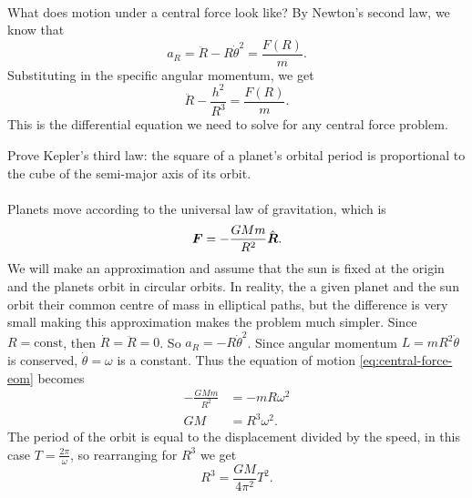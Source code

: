 \documentclass[../classical_mechanics.tex]{subfiles}
\begin{document}
        \paragraph{}
        What does motion under a central force look like?
        By Newton's second law, we know that
        \begin{equation}\label{eq:central-force-eom}
            a_R=\ddot{R}-R\dot{\theta}^2=\frac{F(R)}{m}.
        \end{equation}
        Substituting in the specific angular momentum, we get
        \begin{equation}
            \ddot{R}-\frac{h^2}{R^3}=\frac{F(R)}{m}.
        \end{equation}
        This is the differential equation we need to solve for any central force problem.
        \begin{example}
            Prove Kepler's third law: the square of a planet's orbital period is proportional to the cube of the semi-major axis of its orbit.

            \paragraph{}
            Planets move according to the universal law of gravitation, which is
            \begin{equation}
                \boldsymbol{F}=-\frac{GMm}{R^2}\hat{\boldsymbol{R}}.
            \end{equation}
            We will make an approximation and assume that the sun is fixed at the origin and the planets orbit in circular orbits.
            In reality, the a given planet and the sun orbit their common centre of mass in elliptical paths, but the difference is very small making this approximation makes the problem much simpler.
            Since $R=\text{const}$, then $\dot{R}=\ddot{R}=0$.
            So $a_R=-R\dot{\theta}^2$.
            Since angular momentum $L=mR^2\dot{\theta}$ is conserved, $\dot{\theta}=\omega$ is a constant.
            Thus the equation of motion \ref{eq:central-force-eom} becomes
            \begin{align}
                -\frac{GMm}{R^2}&=-mR\omega^2\\
                GM&=R^3\omega^2.
            \end{align}
            The period of the orbit is equal to the displacement divided by the speed, in this case $T=\frac{2\pi}{\omega}$, so rearranging for $R^3$ we get
            \begin{equation}
                R^3=\frac{GM}{4\pi^2}T^2.
            \end{equation}
        \end{example}
\end{document}
